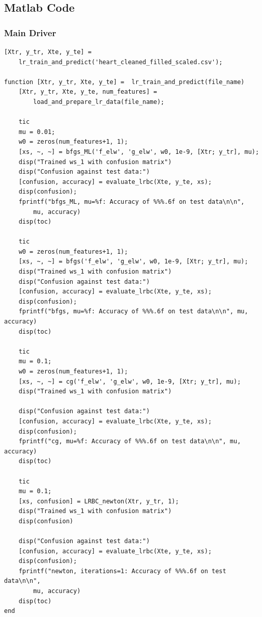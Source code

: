 \documentclass[12pt,conference]{IEEEtran}
\begin{document}
\begin{appendices}
\appendix
\subsection{Matlab Code}
\subsubsection{Main Driver}
\label{AppendixA-Main}
\begin{verbatim}
[Xtr, y_tr, Xte, y_te] = 
    lr_train_and_predict('heart_cleaned_filled_scaled.csv');

function [Xtr, y_tr, Xte, y_te] =  lr_train_and_predict(file_name)
    [Xtr, y_tr, Xte, y_te, num_features] = 
        load_and_prepare_lr_data(file_name);

    tic
    mu = 0.01;
    w0 = zeros(num_features+1, 1);
    [xs, ~, ~] = bfgs_ML('f_elw', 'g_elw', w0, 1e-9, [Xtr; y_tr], mu);
    disp("Trained ws_1 with confusion matrix")
    disp("Confusion against test data:")
    [confusion, accuracy] = evaluate_lrbc(Xte, y_te, xs);
    disp(confusion);
    fprintf("bfgs_ML, mu=%f: Accuracy of %%%.6f on test data\n\n", 
        mu, accuracy)
    disp(toc)
    
    tic
    w0 = zeros(num_features+1, 1);
    [xs, ~, ~] = bfgs('f_elw', 'g_elw', w0, 1e-9, [Xtr; y_tr], mu);
    disp("Trained ws_1 with confusion matrix")
    disp("Confusion against test data:")
    [confusion, accuracy] = evaluate_lrbc(Xte, y_te, xs);
    disp(confusion);
    fprintf("bfgs, mu=%f: Accuracy of %%%.6f on test data\n\n", mu, accuracy)
    disp(toc)
    
    tic
    mu = 0.1;
    w0 = zeros(num_features+1, 1);
    [xs, ~, ~] = cg('f_elw', 'g_elw', w0, 1e-9, [Xtr; y_tr], mu);
    disp("Trained ws_1 with confusion matrix")

    disp("Confusion against test data:")
    [confusion, accuracy] = evaluate_lrbc(Xte, y_te, xs);
    disp(confusion);
    fprintf("cg, mu=%f: Accuracy of %%%.6f on test data\n\n", mu, accuracy)
    disp(toc)

    tic
    mu = 0.1;
    [xs, confusion] = LRBC_newton(Xtr, y_tr, 1);
    disp("Trained ws_1 with confusion matrix")
    disp(confusion)

    disp("Confusion against test data:")
    [confusion, accuracy] = evaluate_lrbc(Xte, y_te, xs);
    disp(confusion);
    fprintf("newton, iterations=1: Accuracy of %%%.6f on test data\n\n", 
        mu, accuracy)
    disp(toc)
end


\end{verbatim}
\end{appendices}
\end{document}
